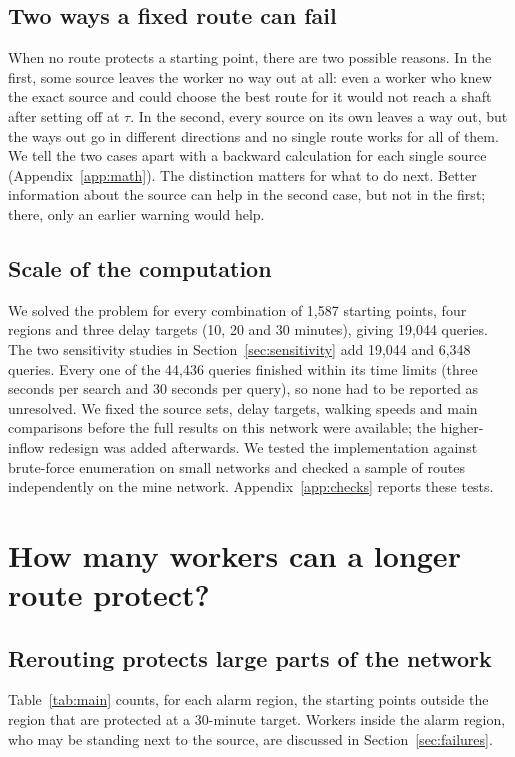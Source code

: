 \documentclass[11pt,a4paper]{article}
\begin{document}
\subsection{Two ways a fixed route can fail}\label{sec:twofailures}
When no route protects a starting point, there are two possible reasons. In the first, some source leaves the worker no way out at all: even a worker who knew the exact source and could choose the best route for it would not reach a shaft after setting off at $\tau$. In the second, every source on its own leaves a way out, but the ways out go in different directions and no single route works for all of them. We tell the two cases apart with a backward calculation for each single source (Appendix~\ref{app:math}). The distinction matters for what to do next. Better information about the source can help in the second case, but not in the first; there, only an earlier warning would help.

\subsection{Scale of the computation}
We solved the problem for every combination of 1,587 starting points, four regions and three delay targets (10, 20 and 30 minutes), giving 19,044 queries. The two sensitivity studies in Section~\ref{sec:sensitivity} add 19,044 and 6,348 queries. Every one of the 44,436 queries finished within its time limits (three seconds per search and 30 seconds per query), so none had to be reported as unresolved. We fixed the source sets, delay targets, walking speeds and main comparisons before the full results on this network were available; the higher-inflow redesign was added afterwards. We tested the implementation against brute-force enumeration on small networks and checked a sample of routes independently on the mine network. Appendix~\ref{app:checks} reports these tests.

\section{How many workers can a longer route protect?}\label{sec:results}
\subsection{Rerouting protects large parts of the network}
Table~\ref{tab:main} counts, for each alarm region, the starting points outside the region that are protected at a 30-minute target. Workers inside the alarm region, who may be standing next to the source, are discussed in Section~\ref{sec:failures}.
\end{document}
